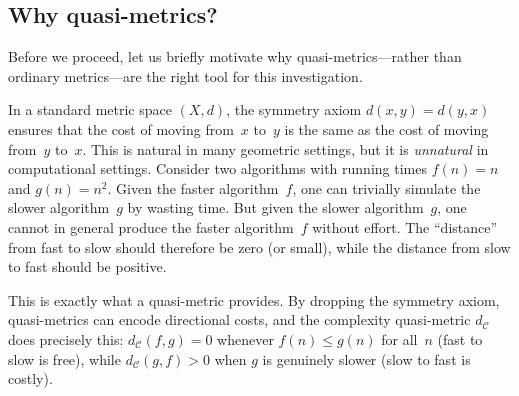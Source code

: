 \documentclass[11pt,a4paper]{article}
\theoremstyle{plain}
\theoremstyle{definition}
\newcommand{\C}{\mathcal{C}}
\begin{document}
\subsection{Why quasi-metrics?}

Before we proceed, let us briefly motivate why quasi-metrics---rather
than ordinary metrics---are the right tool for this investigation.

In a standard metric space $(X,d)$, the symmetry axiom $d(x,y)=d(y,x)$
ensures that the cost of moving from~$x$ to~$y$ is the same as the
cost of moving from~$y$ to~$x$.  This is natural in many geometric
settings, but it is \emph{unnatural} in computational settings.  Consider
two algorithms with running times $f(n)=n$ and $g(n)=n^2$.  Given
the faster algorithm~$f$, one can trivially simulate the slower
algorithm~$g$ by wasting time.  But given the slower algorithm~$g$,
one cannot in general produce the faster algorithm~$f$ without effort.
The ``distance'' from fast to slow should therefore be zero (or small),
while the distance from slow to fast should be positive.

This is exactly what a quasi-metric provides.  By dropping the symmetry
axiom, quasi-metrics can encode directional costs, and the complexity
quasi-metric $d_\C$ does precisely this: $d_\C(f,g)=0$ whenever
$f(n)\le g(n)$ for all~$n$ (fast to slow is free), while
$d_\C(g,f)>0$ when $g$ is genuinely slower (slow to fast is costly).
\end{document}
